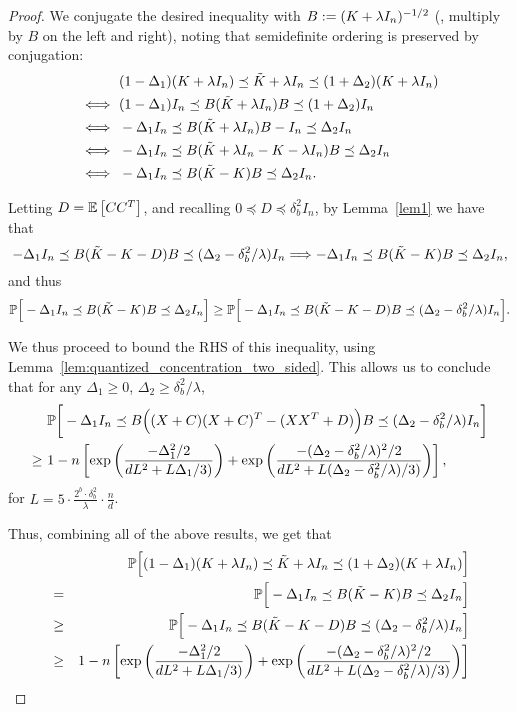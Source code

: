 \documentclass[12pt]{article}
\begin{document}
\begin{proof}
We conjugate the desired inequality with $B \defeq (K + \lambda I_n)^{-1/2}$ (\ie, 
multiply by $B$ on the left and right), noting that semidefinite ordering is
preserved by conjugation:
\begin{align*}
&(1 - \Delta_1) (K + \lambda I_n) \preceq \tK + \lambda I_n \preceq (1 + \Delta_2) (K + \lambda I_n) \\
\iff\ &(1 - \Delta_1) I_n \preceq B (\tK + \lambda I_n) B \preceq (1 + \Delta_2) I_n \\
\iff\ &-\Delta_1 I_n \preceq B (\tK + \lambda I_n) B - I_n \preceq \Delta_2 I_n \\
\iff\ &-\Delta_1 I_n \preceq B (\tK + \lambda I_n - K - \lambda I_n) B \preceq \Delta_2 I_n \\
\iff\ &-\Delta_1 I_n \preceq B (\tK - K) B \preceq \Delta_2 I_n.
\end{align*}

Letting $D=\expect{}{CC^T}$, and recalling  $0 \preceq D \preceq \delta_b^2 I_n$, 
by Lemma~\ref{lem1} we have that 
$$-\Delta_1 I_n \preceq B (\tK - K - D) B \preceq
(\Delta_2 - \delta^2_b/\lambda) I_n 
\Longrightarrow -\Delta_1 I_n \preceq B (\tK - K) B \preceq
\Delta_2 I_n,$$
and thus
$$\Prob\Big[ -\Delta_1 I_n \preceq B (\tK - K) B \preceq
\Delta_2 I_n \Big] \geq  \Prob\Big[ -\Delta_1 I_n \preceq B (\tK - K - D) B \preceq
(\Delta_2 - \delta^2_b/\lambda) I_n \Big].$$
	
We thus proceed to bound the RHS of this inequality, using 
Lemma~\ref{lem:quantized_concentration_two_sided}.
This allows us to conclude that for any $\Delta_1 \geq 0$, $\Delta_2 \geq \delta_b^2/\lambda$,
\begin{align*}
&\Prob\bigg[- \Delta_1 I_n \preceq B\Big((X + C)(X + C)^T - (XX^T+D)\Big)B \preceq (\Delta_2 - \delta^2_b/\lambda) I_n\bigg] \\
\geq\ &1 - n \left[ \exp \left( \frac{-\Delta_1^2/2}{dL^2 +
	L\Delta_1/3)} \right) + \exp \left(\frac{-(\Delta_2 - \delta^2_b/\lambda)^2/2}{dL^2 + L(\Delta_2 - \delta^2_b/\lambda)/3)} \right)  \right],
\end{align*}
for $L = 5 \cdot \frac{2^b \cdot \delta_b^2}{\lambda}\cdot  \frac{n}{d}$.

Thus, combining all of the above results, we get that
\begin{eqnarray*}
&&\Prob\Big[(1 - \Delta_1) (K + \lambda I_n) \preceq \tK + \lambda I_n \preceq (1 + \Delta_2) (K + \lambda I_n)
\Big] \\
&=& \Prob\Big[ -\Delta_1 I_n \preceq B (\tK - K) B \preceq
\Delta_2 I_n \Big] \\
&\geq& \Prob\Big[ -\Delta_1 I_n \preceq B (\tK - K - D) B \preceq
(\Delta_2 - \delta^2_b/\lambda) I_n \Big]\\
&\geq& 1 - n \left[ \exp \left( \frac{-\Delta_1^2/2}{dL^2 +
	L\Delta_1/3)} \right) + \exp \left(\frac{-(\Delta_2 - \delta^2_b/\lambda)^2/2}{dL^2 + L(\Delta_2 - \delta^2_b/\lambda)/3)} \right)  \right]
\end{eqnarray*}
\end{proof}
\end{document}
